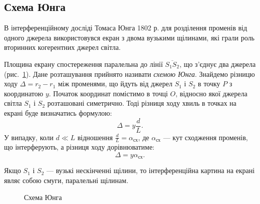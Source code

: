 \subsection*{Схема Юнга}

В інтерференційному досліді Томаса Юнга 1802 р. для розділення променів від одного джерела використовувся екран з двома вузькими щілинами, які грали роль вторинних когерентних джерел світла.

Площина екрану спостереження паралельна до лінії $\overline{S_1S_2}$, що з'єднує два джерела (рис.~\ref{fig:YoungScheme}). Дане розташування прийнято називати \emph{схемою Юнга}. Знайдемо різницю ходу $\Delta = r_2 - r_1$ між променями, що йдуть від джерел $S_1$ і $S_2$ в точку $P$ з координатою $y$. Початок координат помістимо в точці $O$, відносно якої джерела світла $S_1$ і $S_2$ розташовані симетрично. Тоді різниця ходу хвиль в точках на екрані буде визначатись формулою:
\begin{equation}\label{eq:Delta_Young_Scheme}
    \Delta = y \frac{d}{L}.%
\end{equation}
У випадку, коли $ d \ll L $ відношення $ \frac{d}{L} = \alpha_\text{сх}$, де $ \alpha_\text{сх} $ --- кут сходження променів, що інтерферують, а різниця ходу дорівнюватиме:
\begin{equation}\label{eq:Delta_Young_Scheme'}
\Delta = y\alpha_\text{сх}. \tag{\theequation а}
\end{equation}

Якщо $ S_1 $ і $ S_2 $ --- вузькі нескінченні щілини, то інтерференційна картина на екрані являє собою смуги, паралельні щілинам.



\begin{figure}[!h]
	\centering
	
	\caption{Схема Юнга}
	\label{fig:YoungScheme}
\end{figure}

